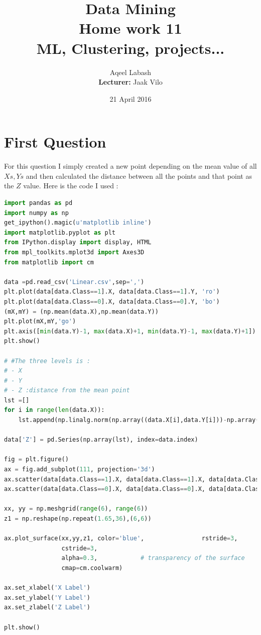 \documentclass{article}
\title{Data Mining\\
		Home work 11\\ML, Clustering, projects... }
\author{Aqeel Labash\\ \textbf{Lecturer:} Jaak Vilo}
\date{21 April 2016}
\begin{document}
	\maketitle
\section*{First Question}
For this question I simply created a new point depending on the mean value of all \(Xs ,Ys\) and then calculated the distance between all the points and that point as the \(Z\) value. Here is the code I used : 
\begin{lstlisting}[language=Python]
import pandas as pd
import numpy as np
get_ipython().magic(u'matplotlib inline')
import matplotlib.pyplot as plt
from IPython.display import display, HTML
from mpl_toolkits.mplot3d import Axes3D
from matplotlib import cm

data =pd.read_csv('Linear.csv',sep=',')
plt.plot(data[data.Class==1].X, data[data.Class==1].Y, 'ro')
plt.plot(data[data.Class==0].X, data[data.Class==0].Y, 'bo')
(mX,mY) = (np.mean(data.X),np.mean(data.Y))
plt.plot(mX,mY,'go')
plt.axis([min(data.Y)-1, max(data.X)+1, min(data.Y)-1, max(data.Y)+1])
plt.show()

# #The three levels is :
# - X
# - Y
# - Z :distance from the mean point
lst =[]
for i in range(len(data.X)):
    lst.append(np.linalg.norm(np.array((data.X[i],data.Y[i]))-np.array((mX,mY))))

data['Z'] = pd.Series(np.array(lst), index=data.index)

fig = plt.figure()
ax = fig.add_subplot(111, projection='3d')
ax.scatter(data[data.Class==1].X, data[data.Class==1].X, data[data.Class==1].Z, c='r', marker='o')
ax.scatter(data[data.Class==0].X, data[data.Class==0].X, data[data.Class==0].Z, c='b', marker='o')

xx, yy = np.meshgrid(range(6), range(6))
z1 = np.reshape(np.repeat(1.65,36),(6,6))

ax.plot_surface(xx,yy,z1, color='blue',                rstride=3, 
                cstride=3, 
                alpha=0.3,            # transparency of the surface 
                cmap=cm.coolwarm)

ax.set_xlabel('X Label')
ax.set_ylabel('Y Label')
ax.set_zlabel('Z Label')

plt.show()
\end{lstlisting}
\end{document}
